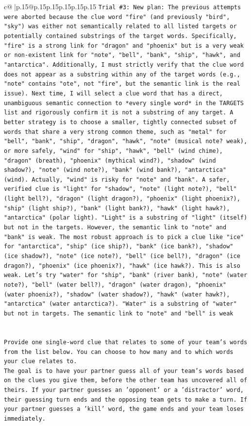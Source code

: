 \documentclass{article}
\begin{document}
{\begin{supertabular}{c@{$\;$}|p{.15\linewidth}@{}p{.15\linewidth}p{.15\linewidth}p{.15\linewidth}p{.15\linewidth}p{.15\linewidth}}
{{{\texttt{Trial \#3: New plan: The previous attempts were aborted because the clue word "fire" (and previously "bird", "sky") was either not semantically related to all listed targets or potentially contained substrings of the target words. Specifically, "fire" is a strong link for "dragon" and "phoenix" but is a very weak or non{-}existent link for "note", "bell", "bank", "ship", "hawk", and "antarctica". Additionally, I must strictly verify that the clue word does not appear as a substring within any of the target words (e.g., "note" contains "ote", not "fire", but the semantic link is the real issue). Next time, I will select a clue word that has a direct, unambiguous semantic connection to *every single word* in the TARGETS list and rigorously confirm it is not a substring of any target. A better strategy is to choose a smaller, tightly connected subset of words that share a very strong common theme, such as "metal" for "bell", "bank", "ship", "dragon", "hawk", "note" (musical note? weak), or more safely, "wind" for "ship", "hawk", "bell" (wind chime), "dragon" (breath), "phoenix" (mythical wind?), "shadow" (wind shadow?), "note" (wind note?), "bank" (wind bank?), "antarctica" (wind). Actually, "wind" is risky for "note" and "bank". A safer, verified clue is "light" for "shadow", "note" (light note?), "bell" (light bell?), "dragon" (light dragon?), "phoenix" (light phoenix?), "ship" (light ship?), "bank" (light bank?), "hawk" (light hawk?), "antarctica" (polar light). "Light" is a substring of "light" (itself) but not in the targets. However, the semantic link to "note" and "bank" is weak. The most robust approach is to pick a clue like "ice" for "antarctica", "ship" (ice ship?), "bank" (ice bank?), "shadow" (ice shadow?), "note" (ice note?), "bell" (ice bell?), "dragon" (ice dragon?), "phoenix" (ice phoenix?), "hawk" (ice hawk?). This is also weak. Let's try "water" for "ship", "bank" (river bank), "note" (water note?), "bell" (water bell?), "dragon" (water dragon), "phoenix" (water phoenix?), "shadow" (water shadow?), "hawk" (water hawk?), "antarctica" (water antarctica?). "Water" is a substring of "water" but not in targets. The semantic link to "note" and "bell" is weak} \\
\\ 
\\ 
\texttt{Provide one single{-}word clue that relates to some of your team's words from the list below. You can choose to how many and to which words your clue relates to.} \\
\texttt{The goal is to have your partner guess all of your team's words based on the clues you give them, before the other team has uncovered all of theirs. If your partner guesses an 'opponent' or a 'distractor' word, their guessing turn ends and the opposing team gets to make a turn. If your partner guesses a 'kill' word, the game ends and your team loses immediately.} \\
}}}
\end{supertabular}}
\end{document}
